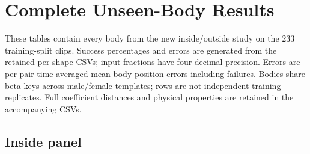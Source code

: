 \documentclass[11pt]{article}
\begin{document}
\section{Complete Unseen-Body Results}\label{app:unseen_tables}
These tables contain every body from the new inside/outside study on the
233 training-split clips. Success percentages and errors are generated from
the retained per-shape CSVs; input fractions have four-decimal precision.
Errors are per-pair time-averaged mean body-position errors including failures.
Bodies share beta keys across male/female templates; rows are not independent
training replicates. Full coefficient distances and physical properties are
retained in the accompanying CSVs.

\subsection{Inside panel}
\begingroup\scriptsize
\setlength{\tabcolsep}{4pt}
\end{document}
